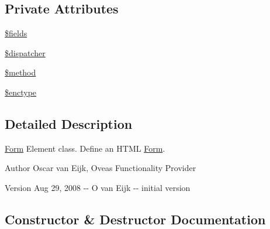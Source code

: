 \subsection*{Private Attributes}
\begin{DoxyCompactItemize}
\item 
\hyperlink{classForm_abcb1c4022c2b93073a00ae65f3269d5b}{\$fields}
\item 
\hyperlink{classForm_ab02292e715af1dc9b0499dd20900aa92}{\$dispatcher}
\item 
\hyperlink{classForm_a3ca31ec7032a41b95c94de22a850672c}{\$method}
\item 
\hyperlink{classForm_a9c23b3ec186995d3df3ad6d4d5efc134}{\$enctype}
\end{DoxyCompactItemize}


\subsection{Detailed Description}
\hyperlink{classForm}{Form} Element class. Define an HTML \hyperlink{classForm}{Form}. \begin{DoxyAuthor}{Author}
Oscar van Eijk, Oveas Functionality Provider 
\end{DoxyAuthor}
\begin{DoxyVersion}{Version}
Aug 29, 2008 -\/-\/ O van Eijk -\/-\/ initial version 
\end{DoxyVersion}


\subsection{Constructor \& Destructor Documentation}
